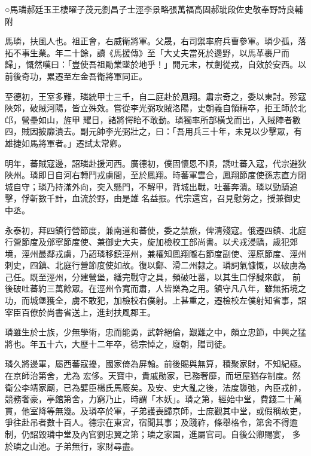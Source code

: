
\begin{pinyinscope}

 ○馬璘郝廷玉王棲曜子茂元劉昌子士涇李景略張萬福高固郝玼段佐史敬奉野詩良輔附



 馬璘，扶風人也。祖正會，右威衛將軍。父晟，右司禦率府兵曹參軍。璘少孤，落拓不事生業。年二十餘，讀《馬援傳》至「大丈夫當死於邊野，以馬革裹尸而歸」，慨然嘆曰：「豈使吾祖勛業墜於地乎！」開元末，杖劍從戎，自效於安西。以前後奇功，累遷至左金吾衛將軍同正。



 至德初，王室多難，璘統甲士三千，自二庭赴於鳳翔。肅宗奇之，委以東討。殄寇陜郊，破賊河陽，皆立殊效。嘗從李光弼攻賊洛陽，史朝義自領精卒，拒王師於北邙，營壘如山，旌甲
 耀日，諸將愕眙不敢動。璘獨率所部橫戈而出，入賊陣者數四，賊因披靡潰去。副元帥李光弼壯之，曰：「吾用兵三十年，未見以少擊眾，有雄捷如馬將軍者。」遷試太常卿。



 明年，蕃賊寇邊，詔璘赴援河西。廣德初，僕固懷恩不順，誘吐蕃入寇，代宗避狄陜州。璘即日自河右轉鬥戎虜間，至於鳳翔。時蕃軍雲合，鳳翔節度使孫志直方閉城自守；璘乃持滿外向，突入懸門，不解甲，背城出戰，吐蕃奔潰。璘以勁騎追擊，俘斬數千計，血流於野，由是雄
 名益振。代宗還宮，召見慰勞之，授兼御史中丞。



 永泰初，拜四鎮行營節度，兼南道和蕃使，委之禁旅，俾清殘寇。俄遷四鎮、北庭行營節度及邠寧節度使、兼御史大夫，旋加檢校工部尚書。以犬戎浸驕，歲犯郊境，涇州最鄰戎虜，乃詔璘移鎮涇州，兼權知鳳翔隴右節度副使、涇原節度、涇州刺史，四鎮、北庭行營節度使如故。復以鄭、滑二州隸之。璘詞氣慷慨，以破虜為己任。既至涇州，分建營堡，繕完戰守之具，頻破吐蕃，以其生口俘馘來獻，
 前後破吐蕃約三萬餘眾。在涇州令寬而肅，人皆樂為之用。鎮守凡八年，雖無拓境之功，而城堡獲全，虜不敢犯，加檢校右僕射。上甚重之，遷檢校左僕射知省事，詔宰臣百僚於尚書省送上，進封扶風郡王。



 璘雖生於士族，少無學術，忠而能勇，武幹絕倫，艱難之中，頗立忠節，中興之猛將也。年五十六，大歷十二年卒，德宗悼之，廢朝，贈司徒。



 璘久將邊軍，屬西蕃寇擾，國家倚為屏翰。前後賜與無算，積聚家財，不知紀極。在京師治第舍，尤為
 宏侈。天寶中，貴戚勛家，已務奢靡，而垣屋猶存制度。然衛公李靖家廟，已為嬖臣楊氏馬廄矣。及安、史大亂之後，法度隳弛，內臣戎帥，競務奢豪，亭館第舍，力窮乃止，時謂「木妖」。璘之第，經始中堂，費錢二十萬貫，他室降等無幾。及璘卒於軍，子弟護喪歸京師，士庶觀其中堂，或假稱故吏，爭往赴吊者數十百人。德宗在東宮，宿聞其事；及踐祚，條舉格令，第舍不得逾制，仍詔毀璘中堂及內官劉忠翼之第；璘之家園，進屬官司。自後公卿賜宴，
 多於璘之山池。子弟無行，家財尋盡。




\end{pinyinscope}
